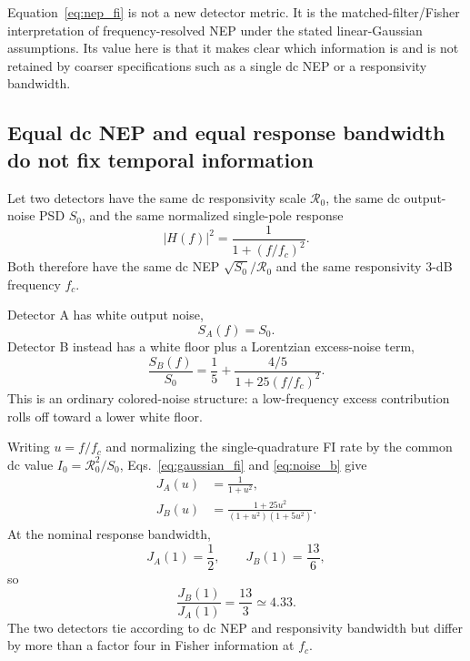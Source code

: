 \documentclass[aps,pra,reprint,superscriptaddress,longbibliography]{revtex4-2}
\begin{document}
Equation~\eqref{eq:nep_fi} is not a new detector metric. It is the matched-filter/Fisher interpretation of frequency-resolved NEP under the stated linear-Gaussian assumptions. Its value here is that it makes clear which information is and is not retained by coarser specifications such as a single dc NEP or a responsivity bandwidth.

\subsection{Equal dc NEP and equal response bandwidth do not fix temporal information}

Let two detectors have the same dc responsivity scale $\mathcal R_0$, the same dc output-noise PSD $S_0$, and the same normalized single-pole response
\begin{equation}
|H(f)|^2=\frac{1}{1+(f/f_c)^2}.
\end{equation}
Both therefore have the same dc NEP $\sqrt{S_0}/\mathcal R_0$ and the same responsivity $3$-dB frequency $f_c$.

Detector A has white output noise,
\begin{equation}
S_A(f)=S_0.
\end{equation}
Detector B instead has a white floor plus a Lorentzian excess-noise term,
\begin{equation}
\frac{S_B(f)}{S_0}=\frac15+\frac{4/5}{1+25(f/f_c)^2}.
\label{eq:noise_b}
\end{equation}
This is an ordinary colored-noise structure: a low-frequency excess contribution rolls off toward a lower white floor.

Writing $u=f/f_c$ and normalizing the single-quadrature FI rate by the common dc value $I_0=\mathcal R_0^2/S_0$, Eqs.~\eqref{eq:gaussian_fi} and \eqref{eq:noise_b} give
\begin{align}
J_A(u)&=\frac{1}{1+u^2},\\
J_B(u)&=\frac{1+25u^2}{(1+u^2)(1+5u^2)}.
\label{eq:AB_FI}
\end{align}
At the nominal response bandwidth,
\begin{equation}
J_A(1)=\frac12,
\qquad
J_B(1)=\frac{13}{6},
\end{equation}
so
\begin{equation}
\boxed{\frac{J_B(1)}{J_A(1)}=\frac{13}{3}\simeq4.33.}
\label{eq:FI_ratio}
\end{equation}
The two detectors tie according to dc NEP and responsivity bandwidth but differ by more than a factor four in Fisher information at $f_c$.
\end{document}
